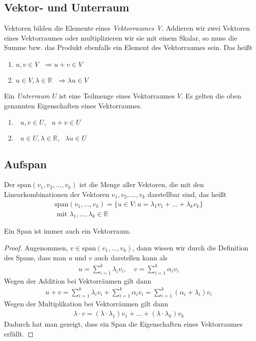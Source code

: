 \subsection{Vektor- und Unterraum}
Vektoren bilden die Elemente eines \textit{Vektorraumes V}. Addieren wir zwei Vektoren eines Vektorraumes oder multiplizieren wir sie mit einem Skalar, so muss die Summe bzw. das Produkt ebenfalls ein Element des Vektorraumes sein. Das hei\ss t
\begin{enumerate}
\item $u, v \in V \text{ }\Rightarrow u+v \in V$
\item $u\in V, \lambda \in \mathbb{R} \text{ }\Rightarrow \lambda u \in V$
\end{enumerate}
\vspace{10pt}
Ein \textit{Unterraum} $U$ ist eine Teilmenge eines Vektorraumes $V$. Es gelten die oben genannten Eigenschaften eines Vektorraumes.
\begin{enumerate}
\item $\text{ }u, v \in U,\text{ } u+v \in U$
\item $\text{ }u \in U, \lambda \in \mathbb{R} ,\text{ }\lambda u \in U$
\end{enumerate}



\subsection{Aufspan}
Der span$(v_1, v_2,\dots,v_k)$ ist die Menge aller Vektoren, die mit den Linearkombinationen der Vektoren $v_1, v_2, \dots, v_k$ darstellbar sind, das hei\ss t
\begin{align*}
\text{span}(v_1,\dots,v_k) = \{u \in V : u = \lambda_1v_1+\dots+\lambda_kv_k\} \\
\text{ mit } \lambda_1,\dots,\lambda_k \in \mathbb{R}
\end{align*}



\begin{theorem}
Ein Span ist immer auch ein Vektorraum.
\end{theorem}
\begin{proof} 
Angenommen, $v \in \text{span}(v_1,\dots,v_k)$,
dann wissen wir durch die Definition des Spans, dass man $u$ und $v$ auch darstellen kann als
\begin{align*}
u = \sum\limits_{i=1}^{k} \lambda_iv_i, \quad v = \sum\limits_{i=1}^{k} \alpha_iv_i
\end{align*}
Wegen der Addition bei Vektorr\"aumen gilt dann
\begin{align*}
	u + v = \sum\limits_{i=1}^{k} \lambda_iv_i + \sum\limits_{i=1}^{k} \alpha_iv_i= \sum\limits_{i=1}^{k} (\alpha_i+\lambda_i)v_i
\end{align*}
Wegen der Multiplikation bei Vektorr\"aumen gilt dann
\begin{align*}
	\lambda\cdot v = (\lambda \cdot \lambda_1) v_1+\dots+(\lambda \cdot \lambda_k)v_k
\end{align*}
Dadurch hat man gezeigt, dass ein Span die Eigenschaften eines Vektorraumes erf\"ullt.
\end{proof}



